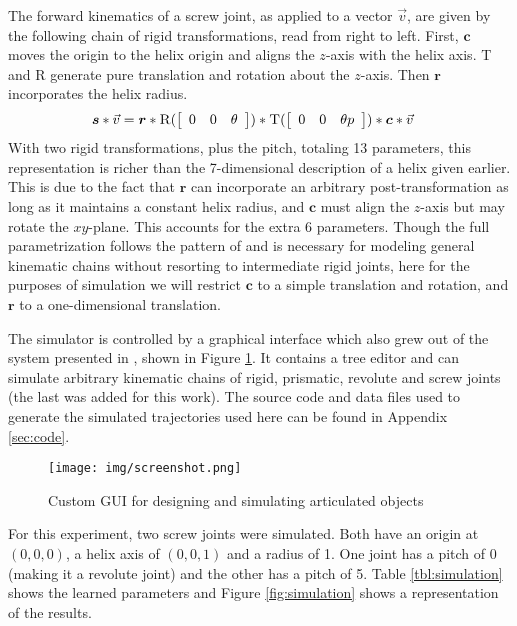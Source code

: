 \documentclass{article} %
\newcommand\mat[2]{\ensuremath{\left[\begin{array}{#1}#2\end{array}\right]}}
\def\xvec{\vec}          \def\xvecstr{with an arrow}
\def\xse{\bm}            \def\xsestr{in boldface}
\begin{document}
The forward kinematics of a screw joint, as applied to a vector $\xvec{v}$, are given by the following chain of rigid transformations, read from right to left. First, $\xse{c}$ moves the origin to the helix origin and aligns the $z$-axis with the helix axis. \textsc{T} and \textsc{R} generate pure translation and rotation about the $z$-axis. Then $\xse{r}$ incorporates the helix radius.
\begin{align}
  \xse{s}*\xvec{v} &= \xse{r} * \textsc{R}(\mat{ccc}{0 & 0 & \theta}) * \textsc{T}(\mat{ccc}{0 & 0 & \theta p}) * \xse{c} * \xvec{v}
\end{align}
With two rigid transformations, plus the pitch, totaling 13 parameters, this representation is richer than the 7-dimensional description of a helix given earlier. This is due to the fact that $\xse{r}$ can incorporate an arbitrary post-transformation as long as it maintains a constant helix radius, and $\xse{c}$ must align the $z$-axis but may rotate the $xy$-plane. This accounts for the extra 6 parameters. Though the full parametrization follows the pattern of \cite{Burka2013} and is necessary for modeling general kinematic chains without resorting to intermediate rigid joints, here for the purposes of simulation we will restrict $\xse{c}$ to a simple translation and rotation, and $\xse{r}$ to a one-dimensional translation.

The simulator is controlled by a graphical interface which also grew out of the system presented in \cite{Burka2013}, shown in Figure \ref{fig:gui}. It contains a tree editor and can simulate arbitrary kinematic chains of rigid, prismatic, revolute and screw joints (the last was added for this work). The source code and data files used to generate the simulated trajectories used here can be found in Appendix \ref{sec:code}.

\begin{figure}[ht]
  \centering
  \texttt{[image: img/screenshot.png]}
  \caption{Custom GUI for designing and simulating articulated objects}
  \label{fig:gui}
\end{figure}

For this experiment, two screw joints were simulated. Both have an origin at $(0, 0, 0)$, a helix axis of $(0, 0, 1)$ and a radius of 1. One joint has a pitch of 0 (making it a revolute joint) and the other has a pitch of 5. Table \ref{tbl:simulation} shows the learned parameters and Figure \ref{fig:simulation} shows a representation of the results.
\end{document}
